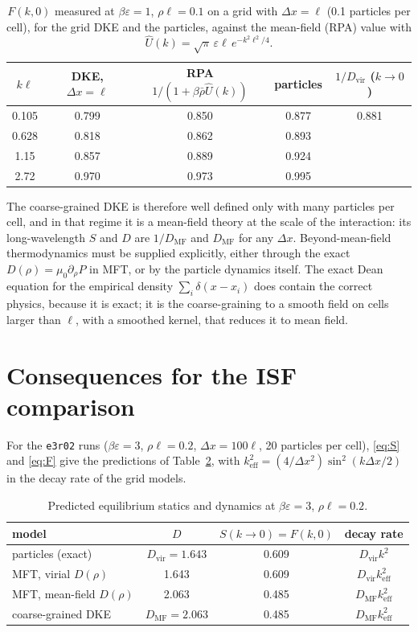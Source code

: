 \documentclass[11pt]{article}
\newcommand{\code}[1]{\texttt{#1}}
\newcommand{\keff}{k_{\mathrm{eff}}}
\newcommand{\Uh}{\hat U}
\newcommand{\MF}{\mathrm{MF}}
\newcommand{\vir}{\mathrm{vir}}
\begin{document}
\begin{table}[h]
\centering
\begin{tabular}{ccccc}
\toprule
$k\ell$ & DKE, $\Delta x=\ell$ & RPA $1/(1+\beta\bar\rho\Uh(k))$ & particles & $1/D_\vir$ ($k\to0$) \\
\midrule
0.105 & 0.799 & 0.850 & 0.877 & 0.881 \\
0.628 & 0.818 & 0.862 & 0.893 & \\
1.15  & 0.857 & 0.889 & 0.924 & \\
2.72  & 0.970 & 0.973 & 0.995 & \\
\bottomrule
\end{tabular}
\caption{$F(k,0)$ measured at $\beta\varepsilon=1$, $\rho\ell=0.1$ on a grid
with $\Delta x=\ell$ (0.1 particles per cell), for the grid DKE and the
particles, against the mean-field (RPA) value with
$\Uh(k)=\sqrt\pi\,\varepsilon\ell\,e^{-k^2\ell^2/4}$.}
\label{tab:dx1}
\end{table}

\noindent The coarse-grained DKE is therefore well defined only with many
particles per cell, and in that regime it is a mean-field theory at the scale
of the interaction: its long-wavelength $S$ and $D$ are $1/D_\MF$ and
$D_\MF$ for any $\Delta x$. Beyond-mean-field thermodynamics must be supplied
explicitly, either through the exact $D(\rho)=\mu_0\partial_\rho P$ in MFT, or
by the particle dynamics itself. The exact Dean equation for the empirical
density $\sum_i\delta(x-x_i)$ does contain the correct physics, because it is
exact; it is the coarse-graining to a smooth field on cells larger than $\ell$,
with a smoothed kernel, that reduces it to mean field.

\section{Consequences for the ISF comparison}

For the \code{e3r02} runs ($\beta\varepsilon=3$, $\rho\ell=0.2$, $\Delta x=100\ell$,
20 particles per cell), \eqref{eq:S} and \eqref{eq:F} give the predictions of
Table~\ref{tab:pred}, with $\keff^2=(4/\Delta x^2)\sin^2(k\Delta x/2)$ in the
decay rate of the grid models.

\begin{table}[h]
\centering
\begin{tabular}{lccc}
\toprule
model & $D$ & $S(k\to0)=F(k,0)$ & decay rate \\
\midrule
particles (exact)            & $D_\vir = 1.643$ & 0.609 & $D_\vir k^2$ \\
MFT, virial $D(\rho)$        & 1.643 & 0.609 & $D_\vir\keff^2$ \\
MFT, mean-field $D(\rho)$    & 2.063 & 0.485 & $D_\MF\keff^2$ \\
coarse-grained DKE           & $D_\MF = 2.063$ & 0.485 & $D_\MF\keff^2$ \\
\bottomrule
\end{tabular}
\caption{Predicted equilibrium statics and dynamics at $\beta\varepsilon=3$,
$\rho\ell=0.2$.}
\label{tab:pred}
\end{table}
\end{document}
